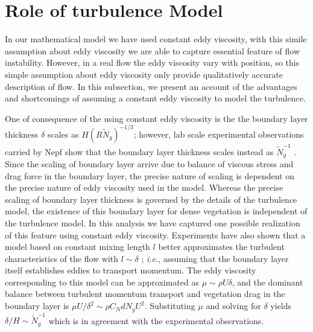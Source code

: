 \documentclass[12pt]{report}   %
\newcommand{\Rey}{{R}}
\newcommand{\Ndg}{\tilde{N}_g}
\newcommand{\ReyNdg}{{\Rey\Ndg}}
\begin{document}
\section{Role of turbulence Model}
In our mathematical model we have used constant eddy viscosity, with this simile assumption about eddy viscosity we are able to capture essential feature of flow instability. However, in a real flow the eddy viscosity vary with position, so this simple assumption about eddy viscosity only provide qualitatively accurate description of flow. 
In this subsection, we present an account of the advantages and shortcomings of assuming a constant eddy viscosity to model the turbulence.

One of consequence of the using constant eddy viscosity is the the boundary layer thickness $\delta$ scales as $H(\ReyNdg)^{-1/3}$; however,
lab scale experimental observations carried by Nepf \cite{Nepf07} show that the boundary layer thickness scales instead as $\Ndg^{-1}$ \cite{Nepf07}.
Since the scaling of boundary layer arrive due to balance of viscous stress and drag force in the boundary layer, the precise nature of scaling is dependent on the precise nature of eddy viscosity used in the model. Whereas the precise scaling of boundary layer thickness is governed by the details of the turbulence model, the existence of this boundary layer for dense vegetation is independent of the turbulence model. In this analysis we have captured one possible realization of this feature using constant eddy viscosity.
Experiments have also shown that a model based on constant mixing length $l$ better approximates the turbulent characteristics of the flow with $l \sim \delta$ \cite{White06,Nepf07}; \textit{i.e.}, assuming that the boundary layer itself establishes eddies to transport momentum. 
The eddy viscosity corresponding to this model can be approximated as $\mu \sim \rho U \delta$, and the dominant balance between turbulent momentum transport and vegetation drag in the boundary layer is  $\mu U/\delta^2 \sim \rho C_N d N_g U^2$.
Substituting $\mu$ and solving for $\delta$ yields $\delta/H \sim \Ndg^{-1}$ which is in agreement with the experimental observations.
\end{document}
